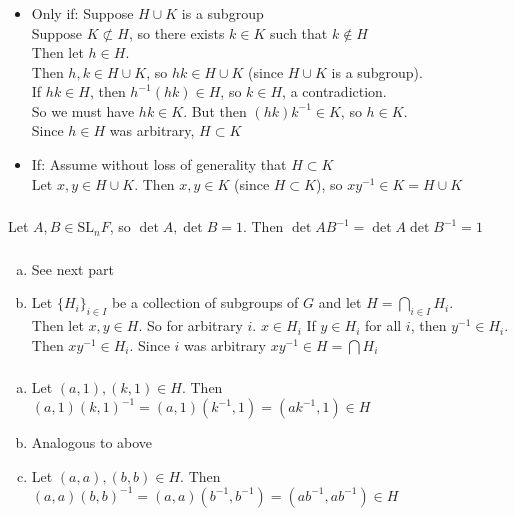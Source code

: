 \documentclass{article}
\newcommand{\set}[1]{ \{ #1 \} }
\newcommand{\inv}[1]{ {#1}^{-1} }
\begin{document}
\subsubsection{}\label{ex1p8}
\begin{itemize}
\item Only if: Suppose $H\cup K$ is a subgroup\\
Suppose $K\not\subset H$, so there exists $k\in K$ such that $k\notin H$\\
Then let $h \in H$.\\
Then $h,k\in H\cup K$, so $hk\in H\cup K$ (since $H\cup K$ is a subgroup).\\
If $hk \in H$, then $\inv{h}(hk) \in H$, so $k\in H$, a contradiction.\\
So we must have $hk \in K$. But then $(hk)\inv{k} \in K$, so $h\in K$.\\
Since $h\in H$ was arbitrary, $H \subset K$
\item If: Assume without loss of generality that $H \subset K$\\
Let $x,y \in H\cup K$. Then $x,y\in K$ (since $H\subset K$), so $x\inv{y} \in K = H\cup K$
\end{itemize}
\subsubsection{}\label{ex1p9}
Let $A,B\in \textrm{SL}_nF$, so $\det A, \det B =1$. Then $\det A\inv{B} = \det A \det \inv{B} = 1$
\subsubsection{}\label{ex1p10}
\begin{enumerate}[(a)]
\item See next part
\item
Let $\set{H_i}_{i\in I}$ be a collection of subgroups of $G$
and let $H = \bigcap_{i\in I}H_i$.\\
Then let $x,y \in H$. So for arbitrary $i$. $x \in H_i$ If $y\in H_i$ for all $i$, then $\inv{y}\in H_i$. Then $x\inv{y} \in H_i$. Since $i$ was arbitrary $x\inv{y} \in H=\bigcap H_i$
\end{enumerate}
\subsubsection{}\label{ex1p11}
\begin{enumerate}[(a)]
\item Let $(a,1),(k,1)\in H$. Then $(a,1)\inv{(k,1)} = (a,1)(\inv{k},1) = (a\inv{k},1) \in H$
\item Analogous to above
\item Let $(a,a),(b,b) \in H$. Then $(a,a)\inv{(b,b)} = (a,a)(\inv{b},\inv{b}) = (a\inv{b},a\inv{b}) \in H$
\end{enumerate}
\end{document}
